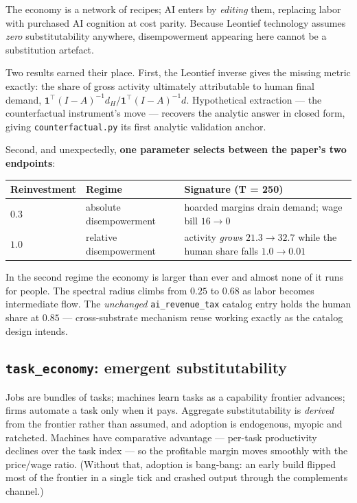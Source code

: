 \documentclass[11pt]{article}
\begin{document}
The economy is a network of recipes; AI enters by \emph{editing} them, replacing labor with
purchased AI cognition at cost parity. Because Leontief technology assumes \emph{zero}
substitutability anywhere, disempowerment appearing here cannot be a substitution artefact.

Two results earned their place. First, the Leontief inverse gives the missing metric
exactly: the share of gross activity ultimately attributable to human final demand,
$\mathbf{1}^{\!\top}(I - A)^{-1} d_H \big/ \mathbf{1}^{\!\top}(I - A)^{-1} d$. Hypothetical
extraction --- the counterfactual instrument's move --- recovers the analytic answer in
closed form, giving \texttt{counterfactual.py} its first analytic validation anchor.

Second, and unexpectedly, \textbf{one parameter selects between the paper's two
endpoints}:

\begin{center}
\begin{tabular}{@{}llp{5.6cm}@{}}
\toprule
\textbf{Reinvestment} & \textbf{Regime} & \textbf{Signature (T = 250)} \\
\midrule
$0.3$ & absolute disempowerment & hoarded margins drain demand; wage bill $16 \to 0$ \\[4pt]
$1.0$ & relative disempowerment & activity \emph{grows} $21.3 \to 32.7$ while the human
        share falls $1.0 \to 0.01$ \\
\bottomrule
\end{tabular}
\end{center}

\noindent In the second regime the economy is larger than ever and almost none of it runs
for people. The spectral radius climbs from $0.25$ to $0.68$ as labor becomes intermediate
flow. The \emph{unchanged} \texttt{ai\_revenue\_tax} catalog entry holds the human share at
$0.85$ --- cross-substrate mechanism reuse working exactly as the catalog design intends.

\subsection{\texttt{task\_economy}: emergent substitutability}

Jobs are bundles of tasks; machines learn tasks as a capability frontier advances; firms
automate a task only when it pays. Aggregate substitutability is \emph{derived} from the
frontier rather than assumed, and adoption is endogenous, myopic and ratcheted. Machines
have comparative advantage --- per-task productivity declines over the task index --- so
the profitable margin moves smoothly with the price/wage ratio. (Without that, adoption is
bang-bang: an early build flipped most of the frontier in a single tick and crashed output
through the complements channel.)
\end{document}
